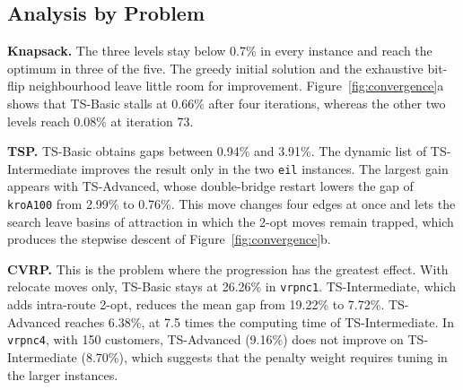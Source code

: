 \documentclass[engproc,proceedingpaper,submit,moreauthors]{Definitions/mdpi}
\begin{document}
\subsection{Analysis by Problem}

\textbf{Knapsack.} The three levels stay below 0.7\% in every instance and reach the optimum in three of the five. The greedy initial solution and the exhaustive bit-flip neighbourhood leave little room for improvement. Figure~\ref{fig:convergence}a shows that TS-Basic stalls at 0.66\% after four iterations, whereas the other two levels reach 0.08\% at iteration 73.

\textbf{TSP.} TS-Basic obtains gaps between 0.94\% and 3.91\%. The dynamic list of TS-Intermediate improves the result only in the two \texttt{eil} instances. The largest gain appears with TS-Advanced, whose double-bridge restart lowers the gap of \texttt{kroA100} from 2.99\% to 0.76\%. This move changes four edges at once and lets the search leave basins of attraction in which the 2-opt moves remain trapped, which produces the stepwise descent of Figure~\ref{fig:convergence}b.

\textbf{CVRP.} This is the problem where the progression has the greatest effect. With relocate moves only, TS-Basic stays at 26.26\% in \texttt{vrpnc1}. TS-Intermediate, which adds intra-route 2-opt, reduces the mean gap from 19.22\% to 7.72\%. TS-Advanced reaches 6.38\%, at 7.5 times the computing time of TS-Intermediate. In \texttt{vrpnc4}, with 150 customers, TS-Advanced (9.16\%) does not improve on TS-Intermediate (8.70\%), which suggests that the penalty weight requires tuning in the larger instances.
\end{document}
